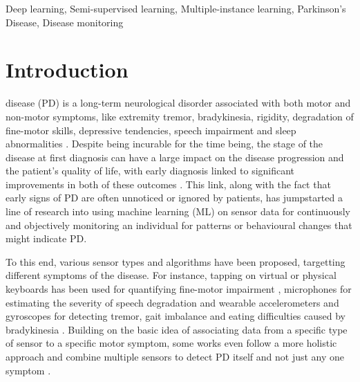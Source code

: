 \documentclass[journal,twoside,web]{ieeecolor}
\begin{document}
\begin{IEEEkeywords}
Deep learning, Semi-supervised learning, Multiple-instance learning, 
Parkinson's Disease, Disease monitoring
\end{IEEEkeywords}

\section{Introduction}

\label{sec:introduction}
 disease (PD) is a long-term neurological
disorder associated with both motor and non-motor symptoms, like extremity tremor, 
bradykinesia, rigidity, degradation of fine-motor skills, depressive tendencies,
speech impairment and sleep abnormalities \cite{Jankovic368}. Despite being incurable for the time
being, the stage of the disease at first diagnosis can have a large impact on
the disease progression and the patient's quality of life, with early diagnosis
linked to significant improvements in both of these outcomes
\cite{pagan2012improving}. This link, along with the fact that early signs of PD
are often unnoticed or ignored by patients, has jumpstarted a line of research
\cite{mei2021machine} into using machine learning (ML) on sensor data for
continuously and objectively monitoring an individual for patterns or
behavioural changes that might indicate PD.

To this end, various sensor types and algorithms have been proposed, targetting
different symptoms of the disease. For instance, 
tapping on virtual or physical keyboards has been used for quantifying
fine-motor impairment \cite{keyboard_original, iakov, tripathi2022keystroke},
microphones for estimating the severity of speech degradation 
\cite{orozco2016towards, 9556632, deep_speech} and wearable accelerometers and
gyroscopes for detecting tremor\cite{s20205817, s100302129,
papadopoulos2019multiple},  gait imbalance\cite{imu_gait, gait2, gait3}  and
eating difficulties caused by bradykinesia \cite{kyritsis2021assessment}. 
Building on the basic idea of associating data from a specific type of sensor 
to a specific motor symptom, some works even follow a more holistic approach and
combine multiple sensors to detect PD itself and not just any one 
symptom \cite{papadopoulos2020unobtrusive, multi_modal1, multi_modal2,
multi_modal3}.
\end{document}
